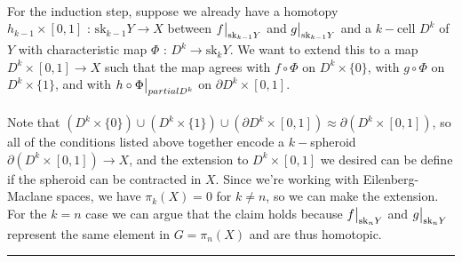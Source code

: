\documentclass[11pt]{article}
\begin{document}
\\
For the induction step, suppose we already have a homotopy $h_{k-1} \times [0, 1] \text{ : }
\mathrm{sk}_{k-1} Y \rightarrow X $ between $\restr{f}{\mathrm{sk}_{k-1} Y}$ and $\restr{g}{\mathrm{sk}_{k-1} Y}$ and a $k-$cell $D^k$ of $Y$ with characteristic map $\Phi \text{ : } D^k \rightarrow \mathrm{sk}_k Y$. We want to extend this to a map $D^k \times [0, 1] \rightarrow X$ such that the map agrees with $f \circ \Phi$ on $D^k \times \{0\}$, with $g \circ \Phi$ on $D^k \times \{1\}$, and with $\restr{h \circ \Phi}{partial D^{k}}$ on $\partial D^k \times [0, 1]$.
\\
\\
Note that $(D^k \times \{0\}) \cup (D^k \times \{1\}) \cup (\partial D^k \times [0, 1]) \approx \partial \left(D^k \times [0, 1]\right)$, so all of the conditions listed above together encode a $k-$spheroid $\partial \left( D^k \times [0, 1] \right) \rightarrow X$, and the extension to $D^k \times [0, 1]$ we desired can be define if the spheroid can be contracted in $X$. Since we're working with Eilenberg-Maclane spaces, we have $\pi_k(X) = 0$ for $k \neq n$, so we can make the extension. For the $k = n$ case we can argue that the claim holds because $\restr{f}{\mathrm{sk}_{n} Y}$ and $\restr{g}{\mathrm{sk}_{n} Y}$ represent the same element in $G = \pi_n(X)$ and are thus homotopic.

\vskip 0.5cm
\hrule
\pagebreak

















% 
\end{document}
